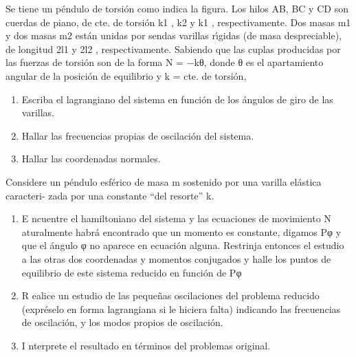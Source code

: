 \documentclass[10pt,oneside]{CBFT_book}
\begin{document}
\begin{ejercicios}
\label{ej12}
\item{ \bf }
Se tiene un péndulo de torsión como indica la figura. Los hilos AB, BC y CD son
cuerdas de piano, de cte. de torsión k1 , k2 y k1 , respectivamente. Dos masas m1 y dos
masas m2 están unidas por sendas varillas rı́gidas (de masa despreciable), de longitud
2l1 y 2l2 , respectivamente. Sabiendo que las cuplas producidas por las fuerzas de
torsión son de la forma N = −kθ, donde θ es el apartamiento angular de la posición
de equilibrio y k = cte. de torsión,
\begin{enumerate}[label=(\alph*)]
\item Escriba el lagrangiano del sistema en función de los ángulos de giro de las varillas.
\item Hallar las frecuencias propias de oscilación del sistema.
\item Hallar las coordenadas normales.
\end{enumerate}


\label{ej13}
\item{ \bf }
Considere un péndulo esférico de masa m sostenido por una varilla elástica caracteri-
zada por una constante “del resorte” k.
\begin{enumerate}[label=(\alph*)]
\item E ncuentre el hamiltoniano del sistema y las ecuaciones de movimiento
N aturalmente habrá encontrado que un momento es constante, digamos Pφ y que el
ángulo φ no aparece en ecuación alguna. Restrinja entonces el estudio a las otras dos
coordenadas y momentos conjugados y halle los puntos de equilibrio de este sistema
reducido en función de Pφ
\item R ealice un estudio de las pequeñas oscilaciones del problema reducido (expréselo
en forma lagrangiana si le hiciera falta) indicando las frecuencias de oscilación,
y los modos propios de oscilación.
\item I nterprete el resultado en términos del problemas original.
\end{enumerate}




\end{ejercicios}
\end{document}
